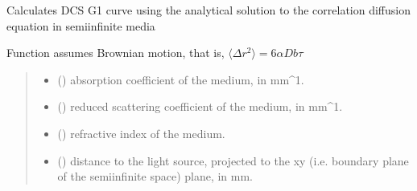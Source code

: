 \documentclass[letterpaper,10pt,english]{sphinxmanual}
\begin{document}
\begin{fulllineitems}
\label{\detokenize{_autosummary/nirfasterff.forward.analytical.semi_infinite_DCS:nirfasterff.forward.analytical.semi_infinite_DCS}}
\pysigstartsignatures
{}
\pysigstopsignatures
\sphinxAtStartPar
Calculates DCS G1 curve using the analytical solution to the correlation diffusion equation in semi\sphinxhyphen{}infinite media

\sphinxAtStartPar
Function assumes Brownian motion, that is, \(\langle\Delta r^2\rangle=6\alpha Db\tau\)
\begin{quote}\begin{description}
\begin{itemize}
\item {} 
\sphinxAtStartPar
{} () \textendash{} absorption coefficient of the medium, in mm\textasciicircum{}\sphinxhyphen{}1.

\item {} 
\sphinxAtStartPar
{} () \textendash{} reduced scattering coefficient of the medium, in mm\textasciicircum{}\sphinxhyphen{}1.

\item {} 
\sphinxAtStartPar
{} () \textendash{} refractive index of the medium.

\item {} 
\sphinxAtStartPar
{} () \textendash{} distance to the light source, projected to the x\sphinxhyphen{}y (i.e. boundary plane of the semi\sphinxhyphen{}infinite space) plane, in mm.


\end{itemize}
\end{description}
\end{quote}
\end{fulllineitems}
\end{document}
